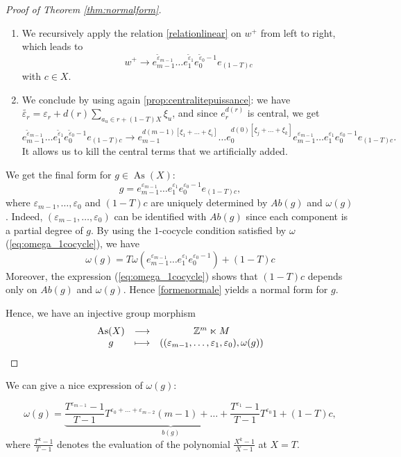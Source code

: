 \documentclass[a4paper,11pt]{amsart}
\theoremstyle{definition}
\newcommand{\Z}{{\mathbb Z}}
\DeclareMathOperator{\As}{As}
\begin{document}
\begin{proof}[Proof of Theorem \ref{thm:normalform}]
\begin{enumerate}
\item We recursively apply the relation \eqref{relationlinear} on $w^+$ from left to right, which leads to 
\[
w^+ \to e_{m-1}^{\tilde{\varepsilon}_{m-1}} \ldots e_1^{\tilde{\varepsilon}_1} e_0^{\tilde{\varepsilon}_0-1} e_{(1-T)c} 
\]
with $c\in X$.
\item We conclude by using again \cref{prop:centralitepuissance}: we have $\tilde{\varepsilon_r} = \varepsilon_r + d(r)\sum\limits_{a_u\in r +(1-T)X} \xi_u$, and since $e_r^{d(r)}$ is central, we get 
\[
e_{m-1}^{\tilde{\varepsilon}_{m-1}} \ldots e_1^{\tilde{\varepsilon}_1} e_0^{\tilde{\varepsilon}_0-1} e_{(1-T)c}
\to
e_{m-1}^{d(m-1)[\xi_1+ \ldots + \xi_i]} \ldots e_0^{d(0)[\xi_j + \ldots + \xi_k]}  e_{m-1}^{\varepsilon_{m-1}} \ldots e_1^{\varepsilon_1} e_0^{\varepsilon_0-1} e_{(1-T)c}.
\]
It allows us to kill the central terms that we artificially added.
\end{enumerate}

We get the final form for $g\in \As(X)$:
\begin{equation} \label{formenormale}
g=e_{m-1}^{\varepsilon_{m-1}} \ldots e_{1}^{\varepsilon_1} e_0^{\varepsilon_0 -1} e_{(1-T)c},
\end{equation}
where $\varepsilon_{m-1},\ldots, \varepsilon_0$ and $(1-T)c$ are uniquely determined by $Ab(g)$ and $\omega(g)$.
Indeed, $(\varepsilon_{m-1},\ldots, \varepsilon_0)$ can be identified with $Ab(g)$ since each component is a partial degree of $g$.
By using the $1$-cocycle condition satisfied by $\omega$ (\ref{eq:omega_1cocycle}), we have
\[
\omega(g) = T\omega\left(e_{m-1}^{\varepsilon_{m-1}} \ldots e_1^{\varepsilon_1} e_0^{\varepsilon_0-1}\right) + (1-T)c
\]
Moreover, the expression (\ref{eq:omega_1cocycle}) shows that $(1-T)c$ depends only on $Ab(g)$ and $\omega(g)$.
Hence \eqref{formenormale} yields a normal form for $g$.

Hence, we have an injective group morphism
\[
\begin{array}{ccc}
\As(X) & \longrightarrow & \Z^m \ltimes M\\
g & \longmapsto & \left( (\varepsilon_{m-1}, \ldots, \varepsilon_1, \varepsilon_0), \omega(g) \right)
\end{array} \qedhere
\]
\end{proof}

We can give a nice expression of $\omega(g)$:

\begin{equation}\label{omega}
\omega(g) =  \underbrace{\frac{T^{\varepsilon_{m-1}} -1}{T-1} T^{\varepsilon_0+\ldots+ \varepsilon_{m-2}} (m-1) + \ldots + \frac{T^{\varepsilon_1} -1}{T-1}T^{\varepsilon_0} 1}_{b(g)} + (1-T)c,
\end{equation}
where $\frac{T^{k}-1}{T-1}$ denotes the evaluation of the polynomial $\frac{X^k-1}{X-1}$ at $X=T$.
\end{document}
